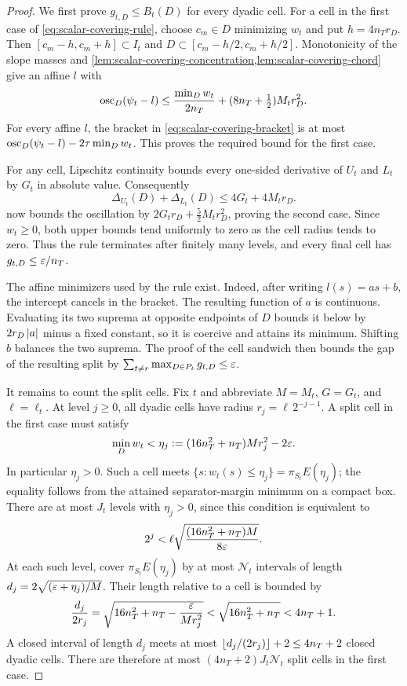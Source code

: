 \begin{proof}
We first prove $g_{t,D}\leq B_t(D)$ for every dyadic cell.
For a cell in the first case of \eqref{eq:scalar-covering-rule}, choose
$c_m\in D$ minimizing $w_t$ and put $h=4n_T r_D$.
Then $[c_m-h,c_m+h]\subset I_t$ and
$D\subset[c_m-h/2,c_m+h/2]$.  Monotonicity of the slope masses and
\cref{lem:scalar-covering-concentration,lem:scalar-covering-chord}
give an affine $l$ with
\[
 \operatorname{osc}_D(\psi_t-l)
 \leq\frac{\min_D w_t}{2n_T}
       +(8n_T+\tfrac12)M_t r_D^2.
\]
For every affine $l$, the bracket in
\eqref{eq:scalar-covering-bracket} is at most
$\operatorname{osc}_D(\psi_t-l)-2\tau\min_D w_t$.  This proves the required bound
for the first case.

For any cell, Lipschitz continuity bounds every one-sided derivative of
$U_t$ and $L_t$ by $G_t$ in absolute value.  Consequently
\[
 \Delta_{U_t}(D)+\Delta_{L_t}(D)\leq4G_t+4M_t r_D.
\]
 now bounds the oscillation by
$2G_t r_D+\tfrac52M_t r_D^2$, proving the second case.
Since $w_t\geq0$, both upper bounds tend uniformly to zero as the
cell radius tends to zero.  Thus the rule terminates after finitely
many levels, and every final cell has $g_{t,D}\leq\varepsilon/n_T$.

The affine minimizers used by the rule exist.  Indeed, after writing
$l(s)=as+b$, the intercept cancels in the bracket.  The resulting
function of $a$ is continuous.  Evaluating its two suprema at opposite
endpoints of $D$ bounds it below by $2r_D\left\lvert a\right\rvert$ minus a fixed
constant, so it is coercive and attains its minimum.  Shifting $b$
balances the two suprema.  The proof of the cell sandwich then bounds
the gap of the resulting split by
$\sum_{t\ne r}\max_{D\in P_t}g_{t,D}\leq\varepsilon$.

It remains to count the split cells.  Fix $t$ and abbreviate
$M=M_t$, $G=G_t$, and $\ell=\ell_t$.
At level $j\geq0$, all dyadic cells have radius
$r_j=\ell\,2^{-j-1}$.
A split cell in the first case must satisfy
\[
 \min_D w_t<\eta_j:=(16n_T^2+n_T)M r_j^2-2\varepsilon.
\]
In particular $\eta_j>0$.  Such a cell meets
$\{s:w_t(s)\leq\eta_j\}=\pi_{S_t}E(\eta_j)$; the equality follows
from the attained separator-margin minimum on a compact box.
There are at most $J_t$ levels with $\eta_j>0$, since this condition is
equivalent to
\[
 2^j<\ell\sqrt{\frac{(16n_T^2+n_T)M}{8\varepsilon}}.
\]
At each such level, cover $\pi_{S_t}E(\eta_j)$ by at most
$\mathcal N_t$ intervals of length
$d_j=2\sqrt{(\varepsilon+\eta_j)/M}$.  Their length relative to a cell is
bounded by
\[
 \frac{d_j}{2r_j}
 =\sqrt{16n_T^2+n_T-\frac{\varepsilon}{Mr_j^2}}
 <\sqrt{16n_T^2+n_T}<4n_T+1.
\]
A closed interval of length $d_j$ meets at most
$\left\lfloor d_j/(2r_j)\right\rfloor+2\leq4n_T+2$ closed dyadic cells.
There are therefore at most $(4n_T+2)J_t\mathcal N_t$ split cells in
the first case.


\end{proof}
